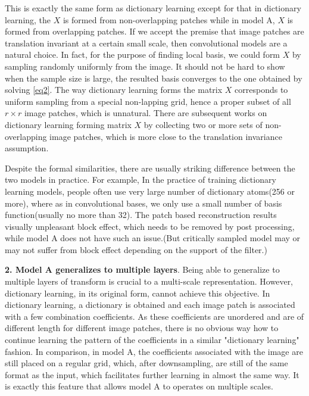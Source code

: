 \documentclass[a4paper]{article}
\begin{document}
This is exactly the same form as dictionary learning except for that in dictionary learning, the $X$ is formed from non-overlapping patches while in model A, $X$ is formed from overlapping patches. If we accept the premise that image patches are translation invariant at a certain small scale, then convolutional models are a natural choice. In fact, for the purpose of finding local basis, we could form $X$ by sampling randomly uniformly from the image. It should not be hard to show when the sample size is large, the resulted basis converges to the one obtained by solving \eqref{eq2}. The way dictionary learning forms the matrix $X$ corresponds to uniform sampling from a special non-lapping grid, hence a proper subset of all $r\times r$ image patches, which is unnatural. There are subsequent works on dictionary learning forming matrix $X$ by collecting two or more sets of non-overlapping image patches, which is more close to the translation invariance assumption.

Despite the formal similarities, there are usually striking difference between the two models in practice. For example, In the practice of training dictionary learning models, people often use very large number of dictionary atoms(256 or more), where as in convolutional bases, we only use a small number of basis function(usually no more than 32). The patch based reconstruction results visually unpleasant block effect, which needs to be removed by post processing, while model A does not have such an issue.(But critically sampled model may or may not suffer from block effect depending on the support of the filter.)

\textbf{2. Model A generalizes to multiple layers}. Being able to generalize to multiple layers of transform is crucial to a multi-scale representation. However, dictionary learning, in its original form, cannot achieve this objective. In dictionary learning, a dictionary is obtained and each image patch is associated with a few combination coefficients. As these coefficients are unordered and are of different length for different image patches, there is no obvious way how to continue learning the pattern of the coefficients in a similar "dictionary learning" fashion. In comparison, in model A, the coefficients associated with the image are still placed on a regular grid, which, after downsampling, are still of the same format as the input, which facilitates further learning in almost the same way. It is exactly this feature that allows model A to operates on multiple scales. 
\end{document}
